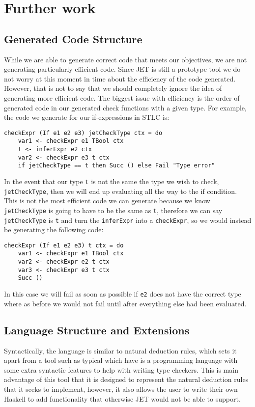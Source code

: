 \section{Further work}
\label{sec:furtherwork}

\subsection{Generated Code Structure}
While we are able to generate correct code that meets our objectives, we are not generating particularly efficient code.
Since JET is still a prototype tool we do not worry at this moment in time about the efficiency of the code generated.
However, that is not to say that we should completely ignore the idea of generating more efficient code.
The biggest issue with efficiency is the order of generated code in our generated check functions with a given type.
For example, the code we generate for our if-expressions in STLC is:
\begin{lstlisting}
checkExpr (If e1 e2 e3) jetCheckType ctx = do
    var1 <- checkExpr e1 TBool ctx
    t <- inferExpr e2 ctx
    var2 <- checkExpr e3 t ctx
    if jetCheckType == t then Succ () else Fail "Type error"
\end{lstlisting}
In the event that our type \texttt{t} is not the same the type we wish to check, \texttt{jetCheckType}, then we will end up evaluating all the way to the if condition.
This is not the most efficient code we can generate because we know \texttt{jetCheckType} is going to have to be the same as \texttt{t}, therefore we can say \texttt{jetCheckType} is \texttt{t} and turn the \texttt{inferExpr} into a \texttt{checkExpr}, so we would instead be generating the following code:
\begin{lstlisting}
checkExpr (If e1 e2 e3) t ctx = do
    var1 <- checkExpr e1 TBool ctx
    var2 <- checkExpr e2 t ctx
    var3 <- checkExpr e3 t ctx
    Succ ()
\end{lstlisting}
In this case we will fail as soon as possible if \texttt{e2} does not have the correct type where as before we would not fail until after everything else had been evaluated.

\subsection{Language Structure and Extensions}
Syntactically, the language is similar to natural deduction rules, which sets it apart from a tool such as typical\cite{grimm2007typical} which have is a programming language with some extra syntactic features to help with writing type checkers.
This is main advantage of this tool that it is designed to represent the natural deduction rules that it seeks to implement, however, it also allows the user to write their own Haskell to add functionality that otherwise JET would not be able to support.  

